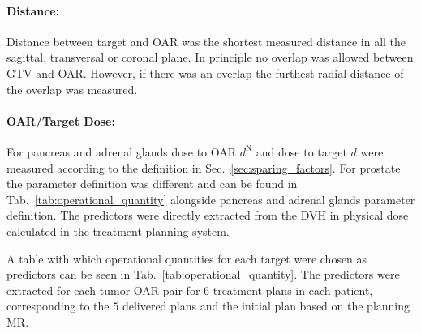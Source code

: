 \documentclass[\relativeRoot/ada.tex]{subfiles}
\begin{document}

\paragraph{Distance:} Distance between target and OAR was the shortest measured distance in all the sagittal, transversal or coronal plane. In principle no overlap was allowed between GTV and OAR. However, if there was an overlap the furthest radial distance of the overlap was measured.

\paragraph{OAR/Target Dose:} For pancreas and adrenal glands dose to OAR $d^{\text{N}}$ and dose to target $d$ were measured according to the definition in Sec.~\ref{sec:sparing_factors}. For prostate the parameter definition was different and can be found in Tab.~\ref{tab:operational_quantity} alongside pancreas and adrenal glands parameter definition. The predictors were directly extracted from the DVH in physical dose calculated in the treatment planning system.

A table with which operational quantities for each target were chosen as predictors can be seen in Tab.~\ref{tab:operational_quantity}. The predictors were extracted for each tumor-OAR pair for $6$ treatment plans in each patient, corresponding to the $5$ delivered plans and the initial plan based on the planning MR.
\end{document}
